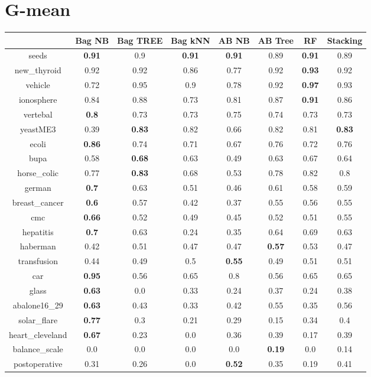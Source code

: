 \documentclass{article}%
\begin{document}
\section*{G{-}mean}%
\begin{tabular}{c|ccccccc}%
&Bag NB&Bag TREE&Bag kNN&AB NB&AB Tree&RF&Stacking\\%
\hline%
seeds&\textbf{0.91}&0.9&\textbf{0.91}&\textbf{0.91}&0.89&\textbf{0.91}&0.89\\%
new\_thyroid&0.92&0.92&0.86&0.77&0.92&\textbf{0.93}&0.92\\%
vehicle&0.72&0.95&0.9&0.78&0.92&\textbf{0.97}&0.93\\%
ionosphere&0.84&0.88&0.73&0.81&0.87&\textbf{0.91}&0.86\\%
vertebal&\textbf{0.8}&0.73&0.73&0.75&0.74&0.73&0.73\\%
yeastME3&0.39&\textbf{0.83}&0.82&0.66&0.82&0.81&\textbf{0.83}\\%
ecoli&\textbf{0.86}&0.74&0.71&0.67&0.76&0.72&0.76\\%
bupa&0.58&\textbf{0.68}&0.63&0.49&0.63&0.67&0.64\\%
horse\_colic&0.77&\textbf{0.83}&0.68&0.53&0.78&0.82&0.8\\%
german&\textbf{0.7}&0.63&0.51&0.46&0.61&0.58&0.59\\%
breast\_cancer&\textbf{0.6}&0.57&0.42&0.37&0.55&0.56&0.55\\%
cmc&\textbf{0.66}&0.52&0.49&0.45&0.52&0.51&0.55\\%
hepatitis&\textbf{0.7}&0.63&0.24&0.35&0.64&0.69&0.63\\%
haberman&0.42&0.51&0.47&0.47&\textbf{0.57}&0.53&0.47\\%
transfusion&0.44&0.49&0.5&\textbf{0.55}&0.49&0.51&0.51\\%
car&\textbf{0.95}&0.56&0.65&0.8&0.56&0.65&0.65\\%
glass&\textbf{0.63}&0.0&0.33&0.24&0.37&0.24&0.38\\%
abalone16\_29&\textbf{0.63}&0.43&0.33&0.42&0.55&0.35&0.56\\%
solar\_flare&\textbf{0.77}&0.3&0.21&0.29&0.15&0.34&0.4\\%
heart\_cleveland&\textbf{0.67}&0.23&0.0&0.36&0.39&0.17&0.39\\%
balance\_scale&0.0&0.0&0.0&0.0&\textbf{0.19}&0.0&0.14\\%
postoperative&0.31&0.26&0.0&\textbf{0.52}&0.35&0.19&0.41\\%
\end{tabular}

%
\end{document}
